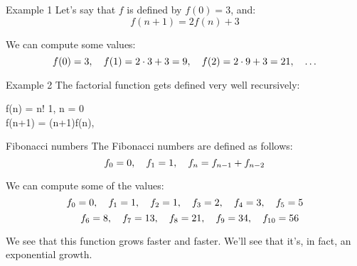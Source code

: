 \documentclass[a4paper]{article}
\begin{document}
\begin{parag}{Example 1}
    Let's say that $f$ is defined by $f\left(0\right) = 3$, and:
    \[f\left(n+1\right) = 2f\left(n\right) + 3\]

    We can compute some values:
    \[f\left(0\right) = 3, \mathspace f\left(1\right) = 2\cdot 3 + 3 = 9, \mathspace f\left(2\right) = 2\cdot 9+ 3 = 21, \mathspace \ldots\]
\end{parag}

\begin{parag}{Example 2}
    The factorial function gets defined very well recursively:
    \begin{functionbypart}{f\left(n\right) = n!}
        1, \mathspace {} n = 0 \\
        f\left(n+1\right) = \left(n+1\right)f\left(n\right), \mathspace {}
    \end{functionbypart}
\end{parag}

\begin{parag}{Fibonacci numbers}
    The Fibonacci numbers are defined as follows:
    \[f_0 = 0, \quad f_1 = 1, \quad f_{n} = f_{n-1} + f_{n-2}\]

    We can compute some of the values:
    \[f_0 = 0, \quad f_1 = 1, \quad f_2 = 1, \quad f_3  = 2, \quad f_4 = 3, \quad f_5 = 5\]
    \[\quad f_6 = 8, \quad f_7 = 13, \quad f_8 = 21, \quad f_9 = 34, \quad f_{10} = 56\]

    We see that this function grows faster and faster. We'll see that it's, in fact, an exponential growth.
\end{parag}
\end{document}
